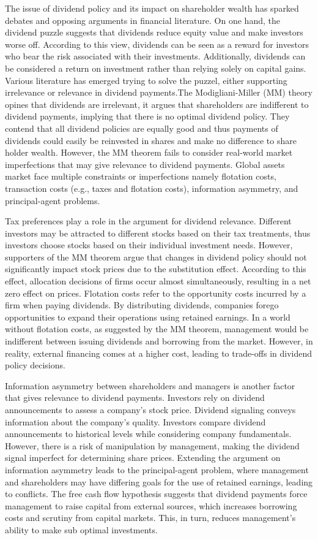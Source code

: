 \documentclass[
]{article}
\begin{document}
The issue of dividend policy and its impact on shareholder wealth has
sparked debates and opposing arguments in financial literature. On one
hand, the dividend puzzle suggests that dividends reduce equity value
and make investors worse off. According to this view, dividends can be
seen as a reward for investors who bear the risk associated with their
investments. Additionally, dividends can be considered a return on
investment rather than relying solely on capital gains. Various
literature has emerged trying to solve the puzzel, either supporting
irrelevance or relevance in dividend payments.The Modigliani-Miller (MM)
theory opines that dividends are irrelevant, it argues that shareholders
are indifferent to dividend payments, implying that there is no optimal
dividend policy. They contend that all dividend policies are equally
good and thus payments of dividends could easily be reinvested in shares
and make no difference to share holder wealth. However, the MM theorem
fails to consider real-world market imperfections that may give
relevance to dividend payments. Global assets market face multiple
constraints or imperfections namely flotation costs, transaction costs
(e.g., taxes and flotation costs), information asymmetry, and
principal-agent problems.

Tax preferences play a role in the argument for dividend relevance.
Different investors may be attracted to different stocks based on their
tax treatments, thus investors choose stocks based on their individual
investment needs. However, supporters of the MM theorem argue that
changes in dividend policy should not significantly impact stock prices
due to the substitution effect. According to this effect, allocation
decisions of firms occur almost simultaneously, resulting in a net zero
effect on prices. Flotation costs refer to the opportunity costs
incurred by a firm when paying dividends. By distributing dividends,
companies forego opportunities to expand their operations using retained
earnings. In a world without flotation costs, as suggested by the MM
theorem, management would be indifferent between issuing dividends and
borrowing from the market. However, in reality, external financing comes
at a higher cost, leading to trade-offs in dividend policy decisions.

Information asymmetry between shareholders and managers is another
factor that gives relevance to dividend payments. Investors rely on
dividend announcements to assess a company's stock price. Dividend
signaling conveys information about the company's quality. Investors
compare dividend announcements to historical levels while considering
company fundamentals. However, there is a risk of manipulation by
management, making the dividend signal imperfect for determining share
prices. Extending the argument on information asymmetry leads to the
principal-agent problem, where management and shareholders may have
differing goals for the use of retained earnings, leading to conflicts.
The free cash flow hypothesis suggests that dividend payments force
management to raise capital from external sources, which increases
borrowing costs and scrutiny from capital markets. This, in turn,
reduces management's ability to make sub optimal investments.
\end{document}
